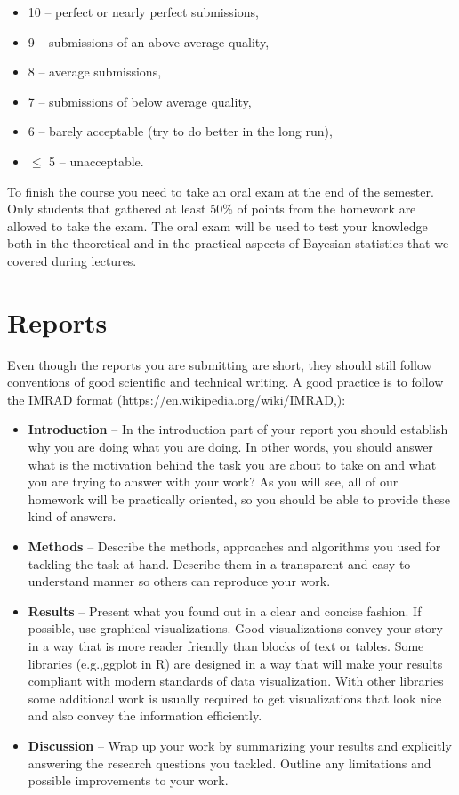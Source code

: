 \documentclass[fleqn,moreauthors,10pt]{ds_report}
\begin{document}
\begin{itemize}
	\item 10 -- perfect or nearly perfect submissions,
	\item 9 -- submissions of an above average quality,
	\item 8 -- average submissions,
	\item 7 -- submissions of below average quality,
	\item 6 -- barely acceptable (try to do better in the long run),
	\item $\leq$ 5 -- unacceptable.
\end{itemize}

To finish the course you need to take an oral exam at the end of the semester. Only students that gathered at least 50\% of points from the homework are allowed to take the exam. The oral exam will be used to test your knowledge both in the theoretical and in the practical aspects of Bayesian statistics that we covered during lectures.

\section*{Reports}

Even though the reports you are submitting are short, they should still follow conventions of good scientific and technical writing. A good practice is to follow the IMRAD format (\url{https://en.wikipedia.org/wiki/IMRAD},):

\begin{itemize}
	\item \textbf{Introduction} -- In the introduction part of your report you should establish why you are doing what you are doing. In other words, you should answer what is the motivation behind the task you are about to take on and what you are trying to answer with your work? As you will see, all of our homework will be practically oriented, so you should be able to provide these kind of answers.
	\item \textbf{Methods} -- Describe the methods, approaches and algorithms you used for tackling the task at hand. Describe them in a transparent and easy to understand manner so others can reproduce your work.
	\item \textbf{Results} -- Present what you found out in a clear and concise fashion. If possible, use graphical visualizations. Good visualizations convey your story in a way that is more reader friendly than blocks of text or tables. Some libraries (e.g.,ggplot in R) are designed in a way that will make your results compliant with modern standards of data visualization. With other libraries some additional work is usually required to get visualizations that look nice and also convey the information efficiently.
	\item \textbf{Discussion} -- Wrap up your work by summarizing your results and explicitly answering the research questions you tackled. Outline any limitations and possible improvements to your work.
\end{itemize}
\end{document}
